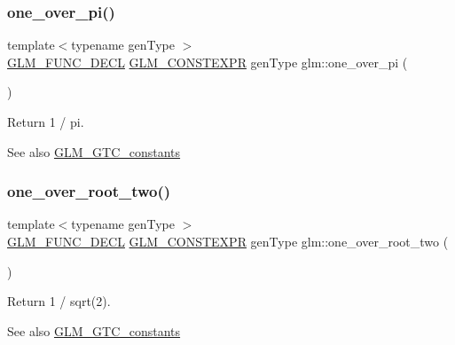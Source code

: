 \subsubsection{\texorpdfstring{one\+\_\+over\+\_\+pi()}{one\_over\_pi()}}
{\footnotesize\ttfamily template$<$typename gen\+Type $>$ \\
\mbox{\hyperlink{setup_8hpp_ab2d052de21a70539923e9bcbf6e83a51}{G\+L\+M\+\_\+\+F\+U\+N\+C\+\_\+\+D\+E\+CL}} \mbox{\hyperlink{setup_8hpp_a08b807947b47031d3a511f03f89645ad}{G\+L\+M\+\_\+\+C\+O\+N\+S\+T\+E\+X\+PR}} gen\+Type glm\+::one\+\_\+over\+\_\+pi (\begin{DoxyParamCaption}{ }\end{DoxyParamCaption})}

Return 1 / pi. \begin{DoxySeeAlso}{See also}
\mbox{\hyperlink{group__gtc__constants}{G\+L\+M\+\_\+\+G\+T\+C\+\_\+constants}} 
\end{DoxySeeAlso}
\mbox{\label{group__gtc__constants_ga788fa23a0939bac4d1d0205fb4f35818}} 
\subsubsection{\texorpdfstring{one\+\_\+over\+\_\+root\+\_\+two()}{one\_over\_root\_two()}}
{\footnotesize\ttfamily template$<$typename gen\+Type $>$ \\
\mbox{\hyperlink{setup_8hpp_ab2d052de21a70539923e9bcbf6e83a51}{G\+L\+M\+\_\+\+F\+U\+N\+C\+\_\+\+D\+E\+CL}} \mbox{\hyperlink{setup_8hpp_a08b807947b47031d3a511f03f89645ad}{G\+L\+M\+\_\+\+C\+O\+N\+S\+T\+E\+X\+PR}} gen\+Type glm\+::one\+\_\+over\+\_\+root\+\_\+two (\begin{DoxyParamCaption}{ }\end{DoxyParamCaption})}

Return 1 / sqrt(2). \begin{DoxySeeAlso}{See also}
\mbox{\hyperlink{group__gtc__constants}{G\+L\+M\+\_\+\+G\+T\+C\+\_\+constants}} 
\end{DoxySeeAlso}
\mbox{\label{group__gtc__constants_ga7c922b427986cbb2e4c6ac69874eefbc}} 

